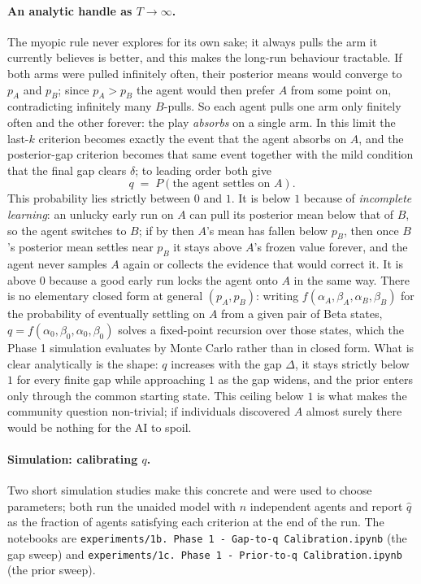 \documentclass[12pt]{article}
\begin{document}
\paragraph{An analytic handle as $T \to \infty$.}
The myopic rule never explores for its own sake; it always pulls the arm it currently believes is better, and this makes the long-run behaviour tractable. If both arms were pulled infinitely often, their posterior means would converge to $p_A$ and $p_B$; since $p_A > p_B$ the agent would then prefer $A$ from some point on, contradicting infinitely many $B$-pulls. So each agent pulls one arm only finitely often and the other forever: the play \emph{absorbs} on a single arm. In this limit the last-$k$ criterion becomes exactly the event that the agent absorbs on $A$, and the posterior-gap criterion becomes that same event together with the mild condition that the final gap clears $\delta$; to leading order both give
\[
  q \;=\; P(\text{the agent settles on } A).
\]
This probability lies strictly between $0$ and $1$. It is below $1$ because of \emph{incomplete learning}: an unlucky early run on $A$ can pull its posterior mean below that of $B$, so the agent switches to $B$; if by then $A$'s mean has fallen below $p_B$, then once $B$'s posterior mean settles near $p_B$ it stays above $A$'s frozen value forever, and the agent never samples $A$ again or collects the evidence that would correct it. It is above $0$ because a good early run locks the agent onto $A$ in the same way. There is no elementary closed form at general $(p_A, p_B)$: writing $f(\alpha_A, \beta_A, \alpha_B, \beta_B)$ for the probability of eventually settling on $A$ from a given pair of Beta states, $q = f(\alpha_0, \beta_0, \alpha_0, \beta_0)$ solves a fixed-point recursion over those states, which the Phase 1 simulation evaluates by Monte Carlo rather than in closed form. What is clear analytically is the shape: $q$ increases with the gap $\Delta$, it stays strictly below $1$ for every finite gap while approaching $1$ as the gap widens, and the prior enters only through the common starting state. This ceiling below $1$ is what makes the community question non-trivial; if individuals discovered $A$ almost surely there would be nothing for the AI to spoil.

\paragraph{Simulation: calibrating $q$.}
Two short simulation studies make this concrete and were used to choose parameters; both run the unaided model with $n$ independent agents and report $\hat q$ as the fraction of agents satisfying each criterion at the end of the run. The notebooks are \texttt{experiments/1b.\ Phase 1 - Gap-to-q Calibration.ipynb} (the gap sweep) and \texttt{experiments/1c.\ Phase 1 - Prior-to-q Calibration.ipynb} (the prior sweep).
\end{document}
